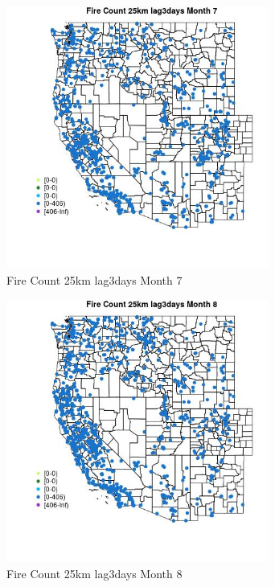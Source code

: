 \begin{figure} 
\centering  
\includegraphics[width=0.77\textwidth]{Code_Outputs/Report_ML_input_PM25_Step4_part_f_de_duplicated_aveswNAs_MapObsMo7Fire_Count_25km_lag3days.jpg} 
\caption{\label{fig:Report_ML_input_PM25_Step4_part_f_de_duplicated_aveswNAsMapObsMo7Fire_Count_25km_lag3days}Fire Count 25km lag3days Month 7} 
\end{figure} 
 

\begin{figure} 
\centering  
\includegraphics[width=0.77\textwidth]{Code_Outputs/Report_ML_input_PM25_Step4_part_f_de_duplicated_aveswNAs_MapObsMo8Fire_Count_25km_lag3days.jpg} 
\caption{\label{fig:Report_ML_input_PM25_Step4_part_f_de_duplicated_aveswNAsMapObsMo8Fire_Count_25km_lag3days}Fire Count 25km lag3days Month 8} 
\end{figure} 
 

